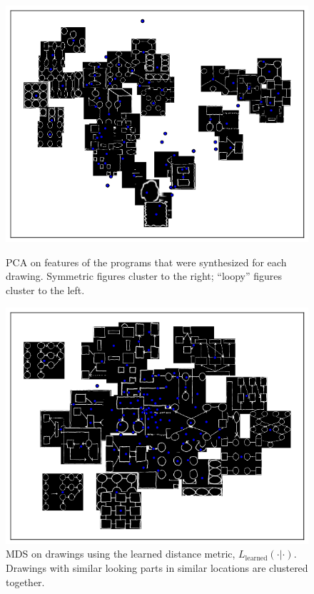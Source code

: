 \documentclass{article}
\begin{document}
\begin{figure}
  \begin{minipage}{0.48\textwidth}
    \includegraphics[width = \textwidth]{figures/PCA.png}
    \caption{PCA on features of the programs that were synthesized for each drawing. Symmetric figures cluster to the right; ``loopy'' figures cluster to the left.}    \label{NMF}
  \end{minipage}\hfill
  \begin{minipage}{0.48\textwidth}
    \includegraphics[width = \textwidth]{figures/imageSimilarity.png} 
    \caption{MDS on drawings using the learned distance metric, $L_{\text{learned}}(\cdot|\cdot)$. Drawings with similar looking parts in similar locations are clustered together.}
  \end{minipage}
\end{figure}
\end{document}
